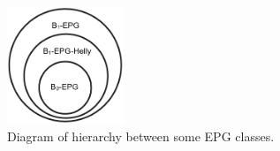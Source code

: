 \begin{figure}[htb]	
\center%
\includegraphics[width=3.5cm]{./img/diagramaClassesEPG.png}
\caption{Diagram of hierarchy between some EPG classes.}
\label{fig:diagramaEPG}
\end{figure}